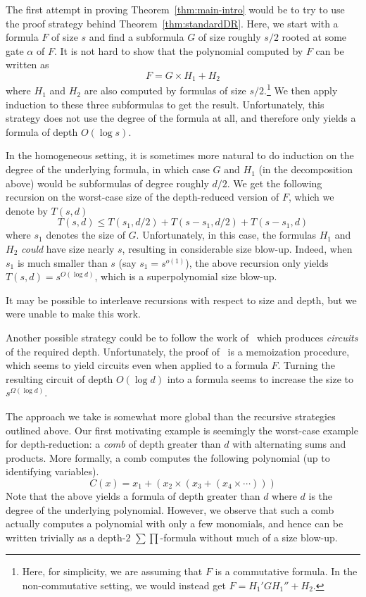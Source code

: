 \documentclass[11pt,a4paper]{article}
\begin{document}
The first attempt in proving Theorem~\ref{thm:main-intro} would be to try to use the proof strategy behind Theorem~\ref{thm:standardDR}. Here, we start with a formula $F$ of size $s$ and find a subformula $G$ of size roughly $s/2$ rooted at some gate $\alpha$ of $F$. It is not hard to show that the polynomial computed by $F$ can be written as
\[
F = G\times H_1 + H_2
\]
where $H_1$ and $H_2$ are also computed by formulas of size $s/2$.\footnote{Here, for simplicity, we are assuming that $F$ is a commutative formula. In the non-commutative setting, we would instead get $F = H_1' G H_1'' + H_2.$} We then apply induction to these three subformulas to get the result. Unfortunately, this strategy does not use the degree of the formula at all, and therefore only yields a formula of depth $O(\log s).$

In the homogeneous setting, it is sometimes more natural to do induction on the degree of the underlying formula, in which case $G$ and $H_1$ (in the decomposition above) would be subformulas of degree roughly $d/2$. We get the following recursion on the worst-case size of the depth-reduced version of $F$, which we denote by $T(s,d)$
\[
T(s,d) \leq T(s_1,d/2) + T(s-s_1,d/2) + T(s-s_1,d)
\]
where $s_1$ denotes the size of $G$. Unfortunately, in this case, the formulas $H_1$ and $H_2$ \emph{could} have size nearly $s$, resulting in considerable size blow-up. Indeed, when $s_1$ is much smaller than $s$ (say $s_1 = s^{o(1)}$), the above recursion only yields $T(s,d) = s^{O(\log d)}$, which is a superpolynomial size blow-up.

It may be possible to interleave recursions with respect to size and depth, but we were unable to make this work. 

Another possible strategy could be to follow the work of~\cite{VSBR} which produces \emph{circuits} of the required depth. Unfortunately, the proof of~\cite{VSBR} is a memoization procedure, which seems to yield circuits even when applied to a formula $F$. Turning the resulting circuit of depth $O(\log d)$ into a formula seems to increase the  size to $s^{\Omega(\log d)}$.

The approach we take is somewhat more global than the recursive strategies outlined above. Our first motivating example is seemingly the worst-case example for depth-reduction: a \emph{comb} of depth greater than $d$ with alternating sums and products. More formally, a comb computes the following polynomial (up to identifying variables).
\[
C(x) = x_1 + (x_2 \times (x_3 + ( x_4 \times \cdots )))
\]
Note that the above yields a formula of depth greater than $d$ where $d$ is the degree of the underlying polynomial. However, we observe that such a comb actually computes a polynomial with only a few monomials, and hence can be written trivially as a depth-$2$ $\sum\prod$-formula without much of a size blow-up. 
\end{document}
